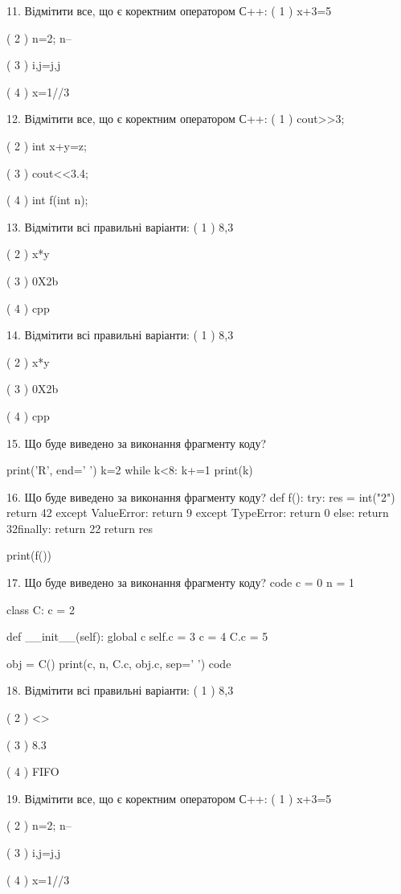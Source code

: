 \documentclass[11pt]{article}
\begin{document}
11. Відмітити все, що є коректним оператором С++:
( 1 ) x+3=5

( 2 ) n=2; n--

( 3 ) i,j=j,j

( 4 ) x=1//3

12. Відмітити все, що є коректним оператором С++:
( 1 ) cout>>3;

( 2 ) int x+y=z;

( 3 ) cout<<3.4;

( 4 ) int f(int n);

13. Відмітити всі правильні варіанти:
( 1 ) 8,3

( 2 ) x*y

( 3 ) 0X2b

( 4 ) cpp

14. Відмітити всі правильні варіанти:
( 1 ) 8,3

( 2 ) x*y

( 3 ) 0X2b

( 4 ) cpp

15. Що буде виведено за виконання фрагменту коду?

print('R', end=' ')
k=2
while k<8:
    k+=1
print(k)


16. Що буде виведено за виконання фрагменту коду?
def f():
    try:
        res = int("2")
return 42    except ValueError: 
        return 9
    except TypeError: 
        return 0
else: return 32finally: return 22    return res

print(f())

17. Що буде виведено за виконання фрагменту коду?
code
c = 0
n = 1

class C:
    c = 2
    
    def __init__(self):
global c        self.c = 3
        c = 4
        C.c = 5

obj = C()
print(c, n, C.c, obj.c, sep=' ')
code

18. Відмітити всі правильні варіанти:
( 1 ) 8,3

( 2 ) <>

( 3 ) 8.3

( 4 ) FIFO

19. Відмітити все, що є коректним оператором С++:
( 1 ) x+3=5

( 2 ) n=2; n--

( 3 ) i,j=j,j

( 4 ) x=1//3
\end{document}
